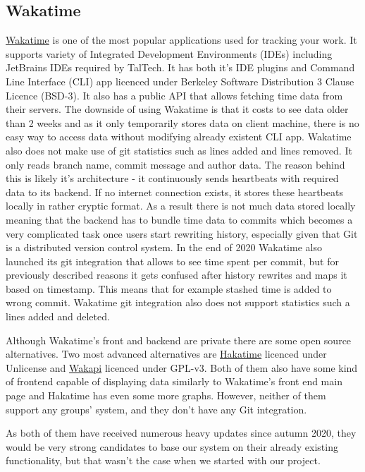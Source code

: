 \subsection{Wakatime}\label{subsec:wakatime}
\href{https://wakatime.com/about}{Wakatime} is one of the most popular applications used for tracking your work.
It supports variety of Integrated Development Environments (IDEs) including JetBrains IDEs required by TalTech.
It has both it's IDE plugins and Command Line Interface (CLI) app licenced under Berkeley Software Distribution 3 Clause Licence (BSD-3).
It also has a public API that allows fetching time data from their servers.
The downside of using Wakatime is that it costs to see data older than 2 weeks and as it only temporarily
stores data on client machine, there is no easy way to access data without modifying already existent CLI app.
Wakatime also does not make use of git statistics such as lines added and lines removed.
It only reads branch name, commit message and author data.
The reason behind this is likely it's architecture - it continuously sends heartbeats with required data to its backend.
If no internet connection exists, it stores these heartbeats locally in rather cryptic format.
As a result there is not much data stored locally meaning that the backend has to bundle time data to commits which becomes a very complicated task
once users start rewriting history, especially given that Git is a distributed version control system.
In the end of 2020 Wakatime also launched its git integration that allows to see time spent per commit, but for previously
described reasons it gets confused after history rewrites and maps it based on timestamp.
This means that for example stashed time is added to wrong commit.
Wakatime git integration also does not support statistics such a lines added and deleted.

Although Wakatime's front and backend are private there are some open source alternatives.
Two most advanced alternatives are \href{https://github.com/mujx/hakatime}{Hakatime} licenced under Unlicense and
\href{https://github.com/muety/wakapi}{Wakapi} licenced under GPL-v3.
Both of them also have some kind of frontend capable of displaying data similarly to Wakatime's front end main page and
Hakatime has even some more graphs.
However, neither of them support any groups' system, and they don't have any Git integration.

As both of them have received numerous heavy updates since autumn 2020, they would be very strong candidates to base
our system on their already existing functionality, but that wasn't the case when we started with our project.


